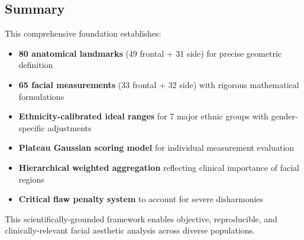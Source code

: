\subsection{Summary}

This comprehensive foundation establishes:
\begin{itemize}
    \item \textbf{80 anatomical landmarks} (49 frontal + 31 side) for precise geometric definition
    \item \textbf{65 facial measurements} (33 frontal + 32 side) with rigorous mathematical formulations
    \item \textbf{Ethnicity-calibrated ideal ranges} for 7 major ethnic groups with gender-specific adjustments
    \item \textbf{Plateau Gaussian scoring model} for individual measurement evaluation
    \item \textbf{Hierarchical weighted aggregation} reflecting clinical importance of facial regions
    \item \textbf{Critical flaw penalty system} to account for severe disharmonies
\end{itemize}

This scientifically-grounded framework enables objective, reproducible, and clinically-relevant facial aesthetic analysis across diverse populations.
